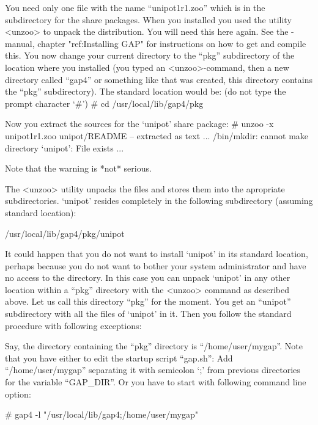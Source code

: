 You need only one file with the name ``unipot1r1.zoo'' which is in the
subdirectory for the share packages. When you installed {\GAP} you used
the utility <unzoo> to unpack the distribution. You will need this here
again. See the {\GAP}-manual, chapter "ref:Installing GAP" for 
instructions on how to get and compile this. You now change your current 
directory to the ``pkg'' subdirectory of the location where you installed
{\GAP} (you typed an <unzoo>-command, then a new directory called ``gap4''
or something like that was created, this directory contains the ``pkg''
subdirectory). The standard location would be:
(do not type the prompt character `\#')
\begintt
# cd /usr/local/lib/gap4/pkg
\endtt

Now you extract the sources for the `unipot' share package:
\begintt
# unzoo -x unipot1r1.zoo
unipot/README     -- extracted as text
...
/bin/mkdir: cannot make directory `unipot': File exists
...
\endtt

Note that the warning is *not* serious.

The <unzoo> utility unpacks the files and stores them into the apropriate
subdirectories. `unipot' resides completely in the following subdirectory
(assuming standard location):

\begintt
/usr/local/lib/gap4/pkg/unipot
\endtt



It could happen that you do not want to install `unipot' in its
standard location, perhaps because you do not want to bother your
system administrator and have no access to the {\GAP} directory. In
this case you can unpack `unipot' in any other location within a
``pkg'' directory with the <unzoo> command as described above. Let us
call this directory ``pkg'' for the moment. You get an ``unipot''
subdirectory with all the files of `unipot' in it. Then you follow the
standard procedure with following exceptions:

Say, the directory containing the ``pkg'' directory is
``/home/user/mygap''.
Note that you have either to edit the startup script ``gap.sh'':
 Add ``/home/user/mygap'' separating it with semicolon `;' from previous
 directories for the variable ``GAP_DIR''.
Or you have to start {\GAP} with following command line option:

\begintt
# gap4 -l "/usr/local/lib/gap4;/home/user/mygap"
\endtt



